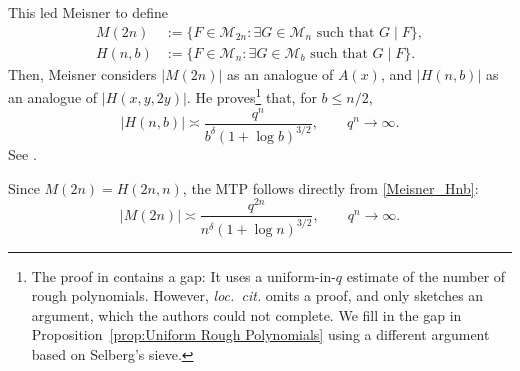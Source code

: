 \documentclass[12pt]{amsart}
\numberwithin{equation}{section}
\theoremstyle{definition}
\theoremstyle{remark}
\begin{document}
    This led Meisner \cite{Meisner_MT} to define 
    \begin{align}
        \label{eq:M2n}
        M(2n) &:= \{ F \in \mathcal{M}_{2n} : \exists G\in \mathcal{M}_n \mbox{ such that } G\mid F\}, \\
        \label{eq:Hnb}
        H(n,b) &:= \{ F \in \mathcal{M}_n : \exists G\in \mathcal{M}_b \mbox{ such that } G\mid F\}.
    \end{align}
    Then, Meisner considers $|M(2n)|$ as an analogue of $A(x)$, and $|H(n,b)|$ as an analogue of $|H(x,y,2y)|$. He proves\footnote{
        The proof in  \cite{Meisner_MT}  contains a gap: It uses a uniform-in-$q$ estimate of the number of rough polynomials. However, \emph{loc.\ cit.} omits a proof, and only sketches an argument,  which the authors could not complete. We fill in the gap in Proposition~\ref{prop:Uniform Rough Polynomials} using a different argument based on Selberg's sieve.} that, for $b\leq n/2$,
    \begin{equation}\label{Meisner_Hnb}
        |H(n,b)| \asymp \frac{q^{n}}{b^\delta(1+ \log b)^{3/2}}, \qquad q^n \to \infty.
    \end{equation}
    See \cite[Theorem 1.2]{Meisner_MT}.


    Since $M(2n)=H(2n,n)$, the MTP follows directly from \eqref{Meisner_Hnb}:
    \[
            |M(2n)| \asymp \frac{q^{2n}}{n^\delta(1+ \log n)^{3/2}}, \qquad q^n\to \infty.
    \]
        
\end{document}
